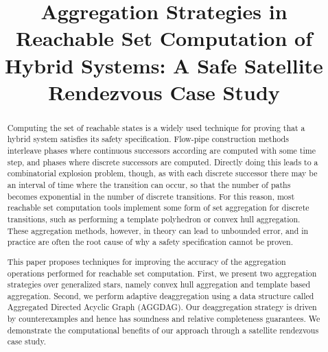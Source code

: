 \documentclass[sigconf]{acmart}
\begin{document}
%
\title[Aggregation Strategies in Reachable Set Computation]{Aggregation Strategies in Reachable Set Computation of Hybrid Systems: A Safe Satellite Rendezvous Case Study}

%
%
%
%

%
\begin{abstract}
  Computing the set of reachable states is a widely used technique for proving that a hybrid system satisfies its safety specification.
  Flow-pipe construction methods interleave phases where continuous successors according are computed with some time step, and
  phases where discrete successors are computed.
  Directly doing this leads to a combinatorial explosion problem, though, as with each discrete successor there may be an interval of time
  where the transition can occur, so that the number of paths becomes exponential in the number of discrete transitions.
  For this reason, most reachable set computation tools implement some form of set aggregation for discrete transitions, such as performing a
  template polyhedron or convex hull aggregation.
  These aggregation methods, however, in theory can lead to unbounded error, and in practice are often
  the root cause of why a safety specification cannot be proven.

  This paper proposes techniques for improving the accuracy of the aggregation operations performed for reachable set computation.
  First, we present two aggregation strategies over generalized stars, namely convex hull aggregation and template based aggregation.
  Second, we perform adaptive deaggregation using a data structure called Aggregated Directed Acyclic Graph (AGGDAG).
  Our deaggregation strategy is driven by counterexamples and hence has soundness and relative completeness guarantees.
  We demonstrate the computational benefits of our approach through a satellite rendezvous case study.
\end{abstract}
\end{document}
